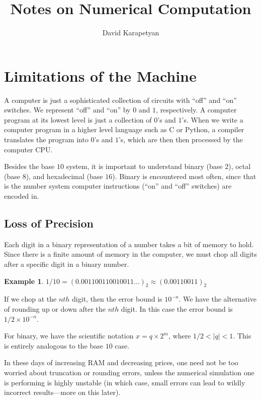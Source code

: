 \documentclass[12pt,reqno]{amsart}
\numberwithin{equation}{section}  %
\newtheorem*{example}{Example}
\begin{document}
\title{Notes on Numerical Computation }
\author{David Karapetyan}
\maketitle
\newpage
\tableofcontents
\newpage
\section{Limitations of the Machine}
A computer is just a sophisticated collection of circuits
with ``off'' and ``on'' switches. We represent ``off'' and
``on'' by $0$ and $1$, respectively. A computer program 
at its lowest level is just a collection of $0$'s and $1$'s.
When we write a computer program in a higher level language such as C
or Python, a compiler translates the program into $0$'s and $1$'s,
which are then then processed by the computer CPU.

Besides the base $10$ system, it is important to understand binary (base $2$),
octal (base $8$), and hexadecimal (base $16$). Binary is encountered most often,
since that is the number system computer instructions (``on'' and ``off'' switches)
are encoded in.

\subsection{Loss of Precision}
Each digit in a binary representation of a number takes a bit of memory to hold.
Since there is a finite amount of memory in the computer, we must chop all digits
after a specific digit in a binary number. 
\begin{example}
$1/10 = (0.001100110010011\ldots)_2 \approx (0.00110011)_2$
\end{example}
If we chop at the $nth$ digit, then the error bound is $10^{-n}$.
We have the alternative of rounding up or down after the $nth$ digit. 
In this case the error bound is $1/2 \times 10^{-n}$.

For binary, we have the scientific notation $x = q \times 2^{m}$, where
$1/2 < |q| < 1$. This is entirely analogous to the base $10$ case.

In these days of increasing RAM and decreasing prices, one need not be too worried
about truncation or rounding errors, unless the numerical simulation one is performing
is highly unstable (in which case, small errors can lead to wildly incorrect results---more
on this later).
\end{document}

